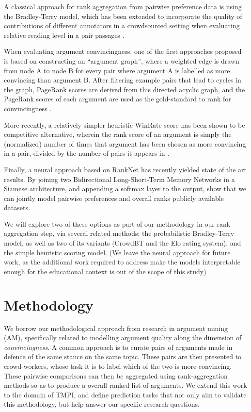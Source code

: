 \documentclass[sigconf]{acmart}
\begin{document}
A classical approach for rank aggregation from pairwise preference data is 
using the Bradley-Terry model, which has been extended to incorporate the 
quality of contributions of different annotators in a crowdsourced setting when 
evaluating relative reading level in a pair passages \cite{chen_pairwise_2013}. 

When evaluating argument convincingness, one of the first approaches proposed 
is based on constructing an ``argument graph'', where a weighted edge is drawn 
from node A to node B for every pair where argument A is labelled as more 
convincing than argument B. 
After filtering example pairs that lead to cycles in the graph, PageRank scores 
are derived from this directed acyclic graph, and the PageRank 
scores of each argument are used as the gold-standard to rank for 
convincingness \cite{habernal_which_2016}.

More recently, a relatively simpler heuristic WinRate score has been shown to 
be competitive alternative, wherein the rank score of an argument is simply the 
(normalized) number of times that argument has been chosen as more convincing 
in a pair, divided by the number of pairs it appears in
\cite{potash_ranking_2019}.

Finally, a neural approach based on RankNet has recently yielded state of the 
art results. By joining two Bidirectional Long-Short-Term Memory Networks in a 
Siamese architecture, and appending a softmax layer to the output, 
\cite{gleize_are_2019} show that we can jointly model pairwise preferences and 
overall ranks publicly available datasets.

We will explore two of these options as part of our methodology in our rank 
aggregation step, via several related methods: 
the probabilistic Bradley-Terry model, as well as two of its variants (CrowdBT 
and the Elo rating system), and the simple heuristic scoring model. 
(We leave the neural approach for future work, as the additional work required 
to address make the models interpretable enough for the educational context is 
out of the scope of this study)


\section{Methodology}

We borrow our methodological approach from research in argument mining (AM), 
specifically related to modelling argument quality along the dimension of 
\textit{convincingness}.
A common approach is to curate pairs of arguments made in defence of the same 
stance on the same topic.
These pairs are then presented to crowd-workers, whose task it is to label 
which of the two is more convincing. 
These pairwise comparisons can then be aggregated using rank-aggregation 
methods so as to produce a overall ranked list of arguments.
We extend this work to the domain of TMPI, and define prediction tasks that not 
only aim to validate this methodology, but help answer our specific research 
questions.
\end{document}
